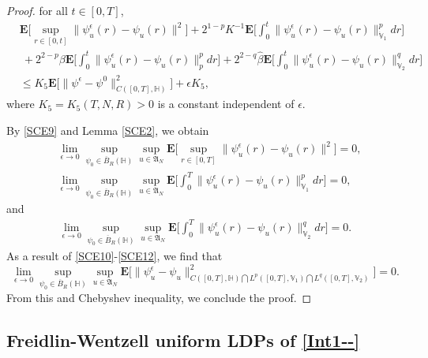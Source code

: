 \documentclass[11pt]{article}
\renewcommand{\leq}{\leqslant}
\numberwithin{equation}{section}
\begin{document}
\begin{proof}
for all $t\in [0,T]$,
 \begin{align}\label{SCE9}
&\mathbf{E}\Big[\sup_{r\in[0,t]}
\|\psi^\epsilon_u(r)
-\psi_u(r)
\|^2\Big]+2^{1-p}K^{-1}\mathbf{E}
\bigg[\int_0^{t}
\|\psi^\epsilon_u(r)
-\psi_u(r)\|^p_{\dot{\mathbb{V}}_1}dr\bigg]
\nonumber\\&\ +2^{2-p}\beta\mathbf{E}
\bigg[
\int_0^{t}
\|\psi^\epsilon_u(r)
-\psi_u(r)\|_{p}^{p}dr\bigg]
+2^{2-q}\widehat{\beta}\mathbf{E}
\bigg[
\int_0^{t}\|\psi^\epsilon_u(r)
-\psi_u(r)\|_{\mathbb{V}_2}^{q}dr\bigg]
\nonumber\\&\leq
K_5\mathbf{E}\Big[\|\psi^\epsilon-\psi^0
\|^2_{C([0,T],\mathbb{H} )}\Big]
+\epsilon K_5,
\end{align}
where $K_5=K_5(T,N,R)>0$  is a constant independent of $\epsilon$.

By \eqref{SCE9} and Lemma \ref{SCE2}, we obtain
\begin{align}\label{SCE10}
&\lim_{\epsilon\rightarrow0}\sup_{\psi_{0}\in \overline{B}_{R}(\mathbb{H})}
\sup_{u\in \mathfrak{A}_N}
\mathbf{E}\Big[\sup_{r\in[0,T]}
\|\psi^\epsilon_u(r)
-\psi_u(r)
\|^2\Big]=0,
\\&\label{SCE11}\lim_{\epsilon\rightarrow0}
\sup_{\psi_{0}\in \overline{B}_{R}(\mathbb{H})}
\sup_{u\in \mathfrak{A}_N}\mathbf{E}
\bigg[\int_0^{T}
\|\psi^\epsilon_u(r)
-\psi_u(r)\|^p_{\mathbb{V}_1}dr\bigg]
=0,
\end{align}
and
\begin{align}\label{SCE12}
\lim_{\epsilon\rightarrow0}\sup_{\psi_{0}\in \overline{B}_{R}(\mathbb{H})}
\sup_{u\in \mathfrak{A}_N}\mathbf{E}
\bigg[
\int_0^{T}\|\psi^\epsilon_u(r)
-\psi_u(r)\|_{\mathbb{V}_2}^{q}dr\bigg]=0.
\end{align}
As a result of \eqref{SCE10}-\eqref{SCE12}, we find that
$$\lim_{\epsilon\rightarrow0}\sup_{\psi_{0}\in \overline{B}_{R}(\mathbb{H})}
\sup_{u\in \mathfrak{A}_N}
\mathbf{E}\Big[ \|\psi^\epsilon_u-\psi_u\|^2_{C([0,T],\mathbb{H}) \bigcap L^p([0,T], \mathbb{V}_1)\bigcap L^q([0,T], \mathbb{V}_2)}\Big]=0.$$
From this and Chebyshev inequality, we conclude the proof.
\end{proof}

\subsection{Freidlin-Wentzell uniform LDPs of \eqref{Int1--}}
\end{document}
